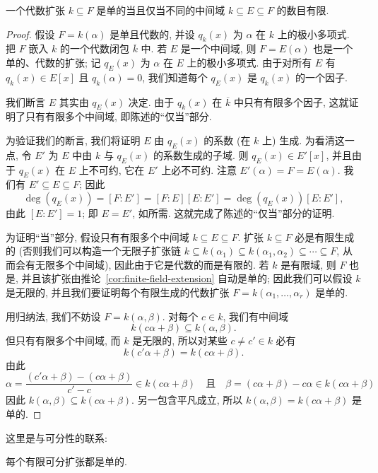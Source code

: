\begin{proposition}\label{prop:simple-inter-finite}
一个代数扩张 $k\subseteq F$ 是单的当且仅当不同的中间域 $k\subseteq E\subseteq F$ 的数目有限.
\end{proposition}

\begin{proof}
假设 $F=k(\alpha)$ 是单且代数的, 并设 $q_k(x)$ 为 $\alpha$ 在 $k$ 上的极小多项式. 把 $F$ 嵌入 $k$ 的一个代数闭包 $\overline{k}$ 中. 若 $E$ 是一个中间域, 则 $F=E(\alpha)$ 也是一个单的、代数的扩张; 记 $q_E(x)$ 为 $\alpha$ 在 $E$ 上的极小多项式. 由于对所有 $E$ 有 $q_k(x)\in E[x]$ 且 $q_k(\alpha)=0$, 我们知道每个 $q_E(x)$ 是 $q_k(x)$ 的一个因子.

我们断言 $E$ 其实由 $q_E(x)$ 决定. 由于 $q_k(x)$ 在 $\overline{k}$ 中只有有限多个因子, 这就证明了只有有限多个中间域, 即陈述的``仅当''部分.

为验证我们的断言, 我们将证明 $E$ 由 $q_E(x)$ 的系数 (在 $k$ 上) 生成. 为看清这一点, 令 $E'$ 为 $E$ 中由 $k$ 与 $q_E(x)$ 的系数生成的子域. 则 $q_E(x)\in E'[x]$, 并且由于 $q_E(x)$ 在 $E$ 上不可约, 它在 $E'$ 上必不可约. 注意 $E'(\alpha)=F=E(\alpha)$. 我们有 $E'\subseteq E\subseteq F$; 因此
\[
\deg(q_E(x))=[F:E']=[F:E][E:E']=\deg(q_E(x))[E:E'],
\]
由此 $[E:E']=1$; 即 $E=E'$, 如所需. 这就完成了陈述的``仅当''部分的证明.

为证明``当''部分, 假设只有有限多个中间域 $k\subseteq E\subseteq F$. 扩张 $k\subseteq F$ 必是有限生成的 (否则我们可以构造一个无限子扩张链 $k\subseteq k(\alpha_1)\subseteq k(\alpha_1,\alpha_2)\subseteq\cdots\subseteq F$, 从而会有无限多个中间域), 因此由于它是代数的而是有限的. 若 $k$ 是有限域, 则 $F$ 也是, 并且该扩张由推论~\ref{cor:finite-field-extension} 自动是单的; 因此我们可以假设 $k$ 是无限的, 并且我们要证明每个有限生成的代数扩张 $F=k(\alpha_1,\ldots,\alpha_r)$ 是单的.

用归纳法, 我们不妨设 $F=k(\alpha,\beta)$. 对每个 $c\in k$, 我们有中间域
\[
k(c\alpha+\beta)\subseteq k(\alpha,\beta).
\]
但只有有限多个中间域, 而 $k$ 是无限的, 所以对某些 $c\neq c'\in k$ 必有
\[
k(c'\alpha+\beta)=k(c\alpha+\beta).
\]
由此
\[
\alpha=\frac{(c'\alpha+\beta)-(c\alpha+\beta)}{c'-c}\in k(c\alpha+\beta)\quad\text{且}\quad\beta=(c\alpha+\beta)-c\alpha\in k(c\alpha+\beta)
\]
因此 $k(\alpha,\beta)\subseteq k(c\alpha+\beta)$. 另一包含平凡成立, 所以 $k(\alpha,\beta)=k(c\alpha+\beta)$ 是单的.
\end{proof}

这里是与可分性的联系:

\begin{proposition}\label{prop:finite-sep-simple}
每个有限可分扩张都是单的.
\end{proposition}

